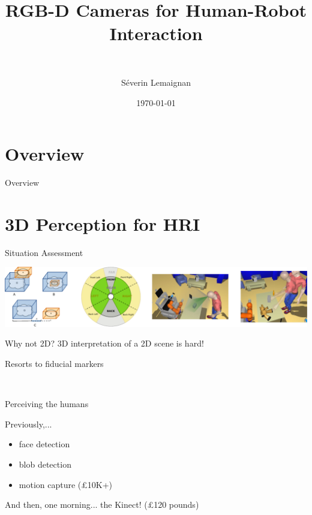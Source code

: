 \documentclass[compress]{beamer}
\title{RGB-D Cameras for Human-Robot Interaction}
\subtitle{~}
\date{\today}
\author{Séverin Lemaignan}
\institute{Centre for Neural Systems and Robotics\\{\Medium Plymouth University}}
\begin{document}


\maketitle

\section*{Overview}
\begin{frame}{Overview}
    \tableofcontents[hideallsubsections]
\end{frame}



\section{3D Perception for HRI}


\begin{frame}{Situation Assessment}

    \centering
    \includegraphics[width=\textwidth]{spark.pdf}
\end{frame}

\begin{frame}{Why not 2D?}
    3D interpretation of a 2D scene is hard!

    Resorts to fiducial markers

        \centering
        \\
\end{frame}

\begin{frame}{Perceiving the humans}

Previously,...

\begin{itemize}
    \item face detection
    \item blob detection
    \item motion capture (£10K+)
\end{itemize}

And then, one morning... the Kinect! (\approx£120 pounds)

\end{frame}
\end{document}
